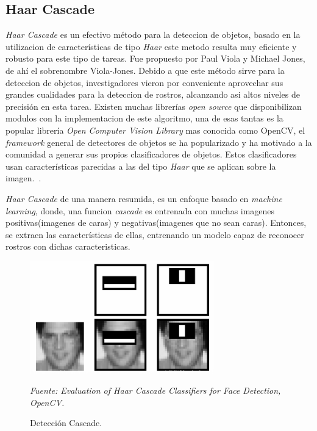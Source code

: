 \subsection{Haar Cascade}
\label{sec:Haar_Cascade}
\textit{Haar Cascade} es un efectivo método para la deteccion de objetos, basado en la utilizacion de características de tipo \textit{Haar} este metodo resulta muy eficiente y robusto para este tipo de tareas. Fue propuesto por Paul Viola y Michael Jones, de ahí el sobrenombre Viola-Jones. Debido a que este método sirve para la deteccion de objetos, investigadores vieron por conveniente aprovechar sus grandes cualidades para la deteccion de rostros, alcanzando asi altos niveles de precisión en esta tarea. Existen muchas librerías \textit{open source} que disponibilizan modulos con la implementacion de este algoritmo, una de esas tantas es la popular librería \textit{Open Computer Vision Library} mas conocida como OpenCV, el \textit{framework} general de detectores de objetos se ha popularizado y ha motivado a la comunidad a generar sus propios clasificadores de objetos. Estos clasificadores usan características parecidas a las del tipo \textit{Haar} que se aplican sobre la imagen.~\cite{20padilla2012evaluation}.

\textit{Haar Cascade} de una manera resumida, es un enfoque basado en \textit{machine learning}, donde, una funcion \textit{cascade} es entrenada con muchas imagenes positivas(imagenes de caras) y negativas(imagenes que no sean caras). Entonces, se extraen las características de ellas, entrenando un modelo capaz de reconocer rostros con dichas caracteristicas.

\begin{figure}[H]
		\centering
		\includegraphics[width=80mm]{Imagenes/deteccion_cascade.png}
		\caption{Detección Cascade.}
		\vspace{0.15cm}
		\textit{Fuente: Evaluation of Haar Cascade Classifiers for Face Detection, OpenCV.}
		\label{fig:deteccion_cascade}
\end{figure} 

